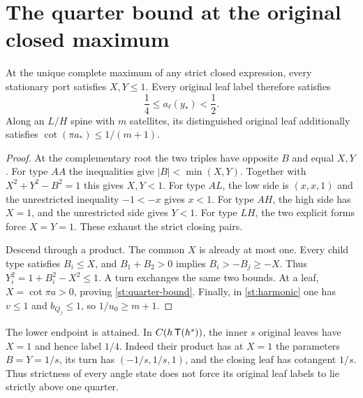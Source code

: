\section{The quarter bound at the original closed maximum}
\begin{theorem}\label{st:quarter}
At the unique complete maximum of any strict closed
expression, every stationary port satisfies $X,Y\le1$.
Every original leaf label therefore satisfies
\begin{equation}\label{st:quarter-bound}
 \frac14\le a_\ell(y_*)<\frac12 .
\end{equation}
Along an $L/H$ spine with $m$ satellites, its
distinguished original leaf additionally satisfies
$\cot(\pi a_*)\le1/(m+1)$.
\end{theorem}
\begin{proof}
At the complementary root the two triples have
opposite $B$ and equal $X,Y$. For type $AA$ the
inequalities give $|B|<\min(X,Y)$.
Together with $X^2+Y^2-B^2=1$ this gives
$X,Y<1$. For type $AL$, the low side is
$(x,x,1)$ and the unrestricted inequality
$-1<-x$ gives $x<1$.
For type $AH$, the high side has $X=1$,
and the unrestricted side gives $Y<1$.
For type $LH$, the two explicit forms force
$X=Y=1$. These exhaust the strict closing pairs.

Descend through a product. The common $X$ is
already at most one. Every child type satisfies
$B_i\le X$, and $B_1+B_2>0$ implies
$B_i>-B_j\ge-X$. Thus
$Y_i^2=1+B_i^2-X^2\le1$.
A turn exchanges the same two bounds.
At a leaf, $X=\cot\pi a>0$, proving
\eqref{st:quarter-bound}. Finally, in
\eqref{st:harmonic} one has $v\le1$ and
$b_{Q_j}\le1$, so $1/u_0\ge m+1$.
\end{proof}
The lower endpoint is attained. In
$C(h\,\mathsf T(h^s))$, the inner $s$ original leaves
have $X=1$ and hence label $1/4$.
Indeed their product has at $X=1$ the parameters
$B=Y=1/s$, its turn has $(-1/s,1/s,1)$, and
the closing leaf has cotangent $1/s$.
Thus strictness of every angle state does not force
its original leaf labels to lie strictly above one quarter.
